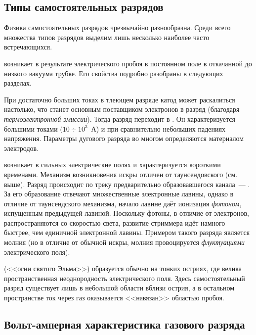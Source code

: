 \begin{labsupplement}


\subsection*{Типы самостоятельных разрядов}

Физика самостоятельных разрядов чрезвычайно разнообразна. Среди всего
множества типов разрядов выделим лишь несколько наиболее часто встречающихся.

 возникает в результате электрического пробоя в
постоянном поле в откачанной до низкого вакуума трубке. Его свойства
подробно разобраны в следующих разделах.

При достаточно больших токах в тлеющем разряде катод может раскалиться
настолько, что станет основным поставщиком электронов в разряд
(благодаря \emph{термоэлектронной эмиссии}). Тогда разряд
переходит в . Он характеризуется большими
токами ($10\div 10^3$~А) и при сравнительно небольших падениях
напряжения. Параметры дугового разряда во многом определяются материалом
электродов.


 возникает в сильных электрические полях
и характеризуется короткими временами. 
Механизм возникновения искры отличен от таунсендовского (см. выше).
Разряд происходит по треку предварительно образовавшегося канала~--- 
. За его образование отвечают множественные электронные лавины,
однако в отличие от таунсендского механизма, начало лавине даёт ионизация
\emph{фотоном}, испущенным предыдущей лавиной. Поскольку фотоны, в отличие
от электронов, распространяются со скоростью света, развитие стриммера идёт
намного быстрее, чем единичной электронной лавины. 
Примером такого разряда является молния (но в отличие от обычной
искры, молния провоцируется \emph{флуктуациями} электрического поля).



 (<<огни святого Эльма>>)
образуется обычно на тонких остриях, где велика пространственная
неоднородность электрического поля. Здесь самостоятельный разряд
существует лишь в небольшой области вблизи острия, а в остальном
пространстве ток через газ оказывается <<навязан>> областью пробоя.



\subsection*{Вольт-амперная характеристика газового разряда}


\end{labsupplement}
